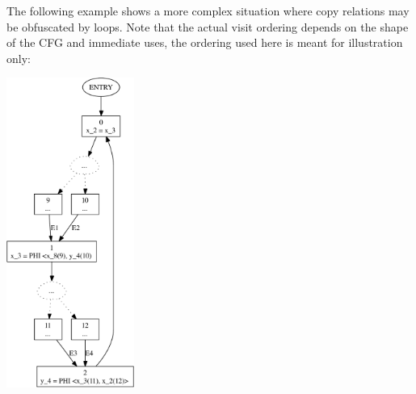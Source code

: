 The following example shows a more complex situation where copy
relations may be obfuscated by loops.  Note that the actual visit
ordering depends on the shape of the CFG and immediate uses, the
ordering used here is meant for illustration only:

\begin{center}
\parbox{2in}{\includegraphics[height=4in]{copy-prop-3}}
\end{center}

